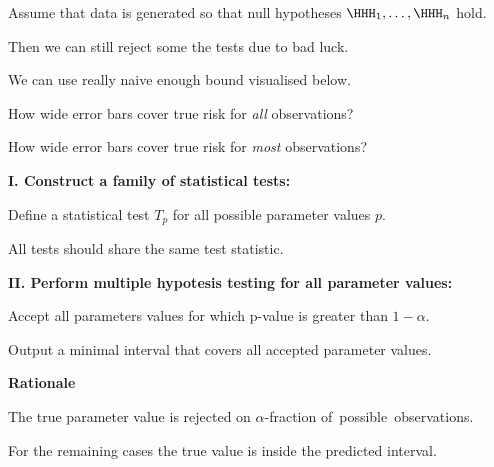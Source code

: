 \documentclass[landscape,footrule]{foils}
\begin{document}

Assume that data is generated so that null hypotheses $\HHH_1,\ldots, \HHH_n$ hold.
\begin{triangles}
\item Then we can still reject some the tests due to bad luck.
\item We can use really naive enough bound visualised below. 
\end{triangles}  

\vspace*{3ex}
\vspace*{-2ex}



\begin{triangles}
\item How wide error bars cover true risk for \emph{all} observations? 
\item How wide error bars  cover true risk for \emph{most} observations? 
\end{triangles}


 
\textbf{I. Construct a family of statistical tests:}
\begin{triangles}
\item Define a statistical test $T_p$ for all possible parameter values $p$.
\item All tests should share the same test statistic.
\end{triangles}
\vspace*{1cm}

\textbf{II. Perform multiple hypotesis testing for all parameter values:}
\begin{triangles}
\item Accept all parameters values for which p-value is greater than $1-\alpha$.  
\item Output a minimal interval that covers all accepted parameter values.
\end{triangles}
\vspace*{1cm}

\textbf{Rationale}
\begin{triangles}
\item The true parameter value is rejected on $\alpha$-fraction of~possible~observations.
\item For the remaining cases the true value is inside the predicted interval. 
\end{triangles}
\end{document}
